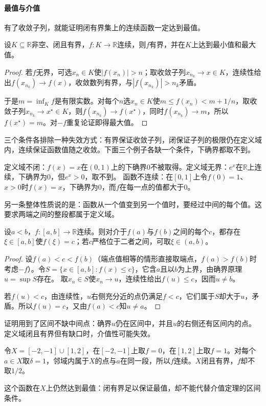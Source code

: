 \paragraph{最值与介值}
有了收敛子列，就能证明闭有界集上的连续函数一定达到最值。
\begin{theorem}[极值定理]
\label{thm:analysis-extreme-value}
设$K\subseteq\mathbb R$非空、闭且有界，$f:K\to\mathbb R$连续，则$f$有界，并在$K$上达到最小值和最大值。
\end{theorem}
\begin{proof}
若$f$无界，可选$x_n\in K$使$|f(x_n)|>n$；取收敛子列$x_{n_k}\to x\in K$，连续性给出$f(x_{n_k})\to f(x)$，收敛数列有界，与$|f(x_{n_k})|>n_k$矛盾。

于是$m=\inf_Kf$是有限实数。对每个$n$选$x_n\in K$使$m\leq f(x_n)<m+1/n$，取收敛子列$x_{n_k}\to x^\star\in K$，则$f(x_{n_k})\to f(x^\star)$，同时$f(x_{n_k})\to m$，所以$f(x^\star)=m$。对$-f$重复论证即得最大值。
\end{proof}
三个条件各排除一种失效方式：有界保证收敛子列，闭保证子列的极限仍在定义域内，连续保证函数值随之收敛。下面三个例子各缺一个条件，下确界都取不到。
\begin{example}[极值定理的条件]
\label{ex:analysis-extrema-failures}
定义域不闭：$f(x)=x$在$(0,1)$上的下确界$0$不被取得。定义域无界：$e^x$在$\mathbb R$上连续，下确界为$0$，但$e^x>0$，取不到。
函数不连续：在$[0,1]$上令$f(0)=1$、$x>0$时$f(x)=x$，下确界为$0$，而$f$在每一点的值都大于$0$。
\end{example}

另一条整体性质说的是：函数从一个值变到另一个值时，要经过中间的每个值。这要求两端之间的整段都属于定义域。
\begin{theorem}[介值定理]
\label{thm:analysis-intermediate-value}
设$a<b$，$f:[a,b]\to\mathbb R$连续。则对介于$f(a)$与$f(b)$之间的每个$c$，都存在$\xi\in[a,b]$使$f(\xi)=c$；若$c$严格位于二者之间，可取$\xi\in(a,b)$。
\end{theorem}
\begin{proof}
设$f(a)<c<f(b)$（端点值相等的情形直接取端点，$f(a)>f(b)$时考虑$-f$）。令$S=\{x\in[a,b]:f(x)\leq c\}$，它含$a$且以$b$为上界，由确界原理$u=\sup S$存在。
取$x_n\in S$使$x_n\to u$，连续性给出$f(u)\leq c$，因而$u\neq b$。

若$f(u)<c$，由连续性，$u$右侧充分近的点仍满足$f<c$，它们属于$S$却大于$u$，矛盾。所以$f(u)=c$，又由$f(a)<c$知$u\neq a$。
\end{proof}
证明用到了区间不缺中间点：确界$u$仍在区间中，并且$u$的右侧还有区间内的点。定义域闭且有界但有缺口时，介值性可能失效。
\begin{example}[有缺口的定义域上不取中间值]
\label{ex:analysis-intermediate-value-gap}
令$X=[-2,-1]\cup[1,2]$，在$[-2,-1]$上取$f=0$，在$[1,2]$上取$f=1$。对每个$a\in X$取$\delta=1$，邻域内属于$X$的点与$a$在同一段，所以$f$连续。$X$闭且有界，$f$却不取$1/2$。
\end{example}
这个函数在$X$上仍然达到最值：闭有界足以保证最值，却不能代替介值定理的区间条件。

